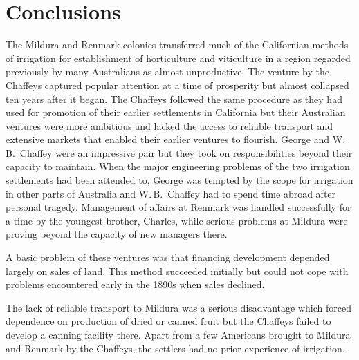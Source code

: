 \section*{Conclusions}

The Mildura and Renmark colonies transferred much of the Californian
methods of irrigation for establishment of horticulture and
viticulture in a region regarded previously by many Australians as
almost unproductive.  The venture by the Chaffeys captured popular
attention at a time of prosperity but almost collapsed ten years after
it began.  The Chaffeys followed the same procedure as they had used
for promotion of their earlier settlements in California but their
Australian ventures were more ambitious and lacked the access to
reliable transport and extensive markets that enabled their earlier
ventures to flourish.  George and W.\,B.~Chaffey were an impressive
pair but they took on responsibilities beyond their capacity to
maintain.  When the major engineering problems of the two irrigation
settlements had been attended to, George was tempted by the scope for
irrigation in other parts of Australia and W.\,B.~Chaffey had to spend
time abroad after personal tragedy.  Management of affairs at Renmark
was handled successfully for a time by the youngest brother, Charles,
while serious problems at Mildura were proving beyond the capacity of
new managers there.

A basic problem of these ventures was that financing development
depended largely on sales of land.  This method succeeded initially
but could not cope with problems encountered early in the 1890s when
sales declined.

The lack of reliable transport to Mildura was a serious disadvantage
which forced dependence on production of dried or canned fruit but the
Chaffeys failed to develop a canning facility there.  Apart from a few
Americans brought to Mildura and Renmark by the Chaffeys, the settlers
had no prior experience of irrigation.


